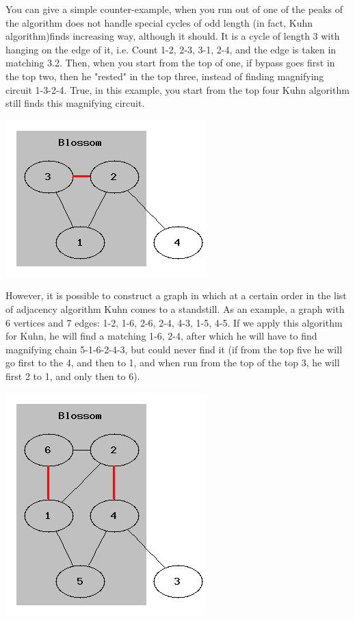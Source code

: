 You can give a simple counter-example, when you run out of one of the peaks of the algorithm does not handle special cycles of odd length (in fact, Kuhn algorithm)finds increasing way, although it should. It is a cycle of length 3 with hanging on the edge of it, i.e. Count 1-2, 2-3, 3-1, 2-4, and the edge is taken in matching 3.2. Then, when you start from the top of one, if bypass goes first in the top two, then he "rested" in the top three, instead of finding magnifying circuit 1-3-2-4. True, in this example, you start from the top four Kuhn algorithm still finds this magnifying circuit.

\includegraphics[scale=0.4]{2.png}

However, it is possible to construct a graph in which at a certain order in the list of adjacency algorithm Kuhn comes to a standstill. As an example, a graph with 6 vertices and 7 edges: 1-2, 1-6, 2-6, 2-4, 4-3, 1-5, 4-5. If we apply this algorithm for Kuhn, he will find a matching 1-6, 2-4, after which he will have to find magnifying chain 5-1-6-2-4-3, but could never find it (if from the top five he will go first to the 4, and then to 1, and when run from the top of the top 3, he will first 2 to 1, and only then to 6).

\includegraphics[scale=0.4]{3.png}

